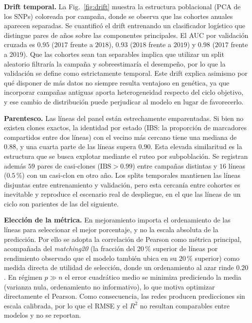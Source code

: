 \documentclass[conference]{IEEEtran}
\begin{document}
\textbf{Drift temporal.} La Fig.~\ref{fig:drift} muestra la estructura poblacional (PCA de los SNPs) coloreada por campaña, donde se observa que las cohortes anuales aparecen separadas. Se cuantificó el drift entrenando un clasificador logístico que distingue pares de años sobre las componentes principales. El AUC por validación cruzada es $0.95$ ($2017$ frente a $2018$), $0.93$ ($2018$ frente a $2019$) y $0.98$ ($2017$ frente a $2019$). Que las cohortes sean tan separables implica que utilizar un split aleatorio filtraría la campaña y sobreestimaría el desempeño, por lo que la validación se define como estrictamente temporal. Este drift explica asimismo por qué disponer de más datos no siempre resulta ventajoso en genética, ya que incorporar campañas antiguas aporta heterogeneidad respecto del ciclo objetivo, y ese cambio de distribución puede perjudicar al modelo en lugar de favorecerlo.

\textbf{Parentesco.} Las líneas del panel están estrechamente emparentadas. Si bien no existen clones exactos, la identidad por estado (IBS: la proporción de marcadores compartidos entre dos líneas) con el vecino más cercano tiene una mediana de $0.88$, y una cuarta parte de las líneas supera $0.90$. Esta elevada similaritud  es  la estructura que se busca explotar mediante el ruteo por subpoblación. Se registran además $59$ pares de casi-clones ($\text{IBS}>0.99$) entre campañas distintas y $16$ líneas ($0.5\,\%$) con un casi-clon en otro año. Los splits temporales mantienen las líneas disjuntas entre entrenamiento y validación, pero esta cercanía entre cohortes es inevitable y reproduce el escenario real de despliegue, en el que las líneas de un ciclo son parientes de las del siguiente.

\textbf{Elección de la métrica.} En mejoramiento importa el ordenamiento de las líneas para seleccionar el mejor porcentaje, y no la escala absoluta de la predicción. Por ello se adopta la correlación de Pearson como métrica principal, acompañada del \textit{matching20}  (la fracción del $20\,\%$ superior de líneas por rendimiento observado que el modelo también ubica en su $20\,\%$ superior) como medida directa de utilidad de selección, donde un ordenamiento al azar rinde $0.20$. En régimen $p\gg n$ el error cuadrático medio se minimiza prediciendo la media (varianza nula, ordenamiento no informativo), lo que motiva optimizar directamente el Pearson. Como consecuencia, las redes producen predicciones sin escala calibrada, por lo que el RMSE y el $R^2$ no resultan comparables entre modelos y no se reportan.
\end{document}
